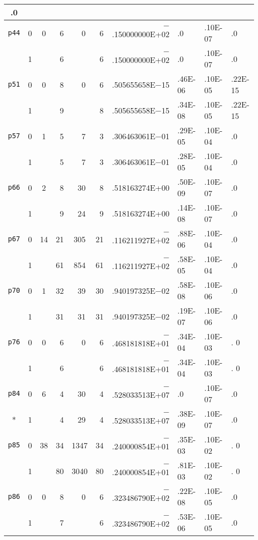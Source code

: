 {\begin{tabular}{ccccccrlll}
.0\\\hline
 {\tt p44} & 0 & 0  &  ~6  &  ~~0  & ~6 &$-$.150000000E+02 &.0      & .10E-07 &
.0\\
           & 1 &    &  ~6  &       &~6  &$-$.150000000E+02 &.0      & .10E-07 &
.0\\\hline
 {\tt p51} & 0 & 0  &  ~8  & ~~0   &~6  &   .505655658E$-$15 &.46E-06 &.10E-05 
&.22E-15\\
           & 1 &    &  ~9  &       &~8  &   .505655658E$-$15 &.34E-08 &.10E-05 
&.22E-15\\\hline
 {\tt p57} & 0 & 1  &  ~5  &  ~~7  &~3  &   .306463061E$-$01 &.29E-05 &.10E-04 
&.0\\
           & 1 &    &  ~5  &  ~~7  &~3  &   .306463061E$-$01 &.28E-05 &.10E-04 
&.0\\\hline
 {\tt p66} & 0 & 2  & ~8   &  ~30  &~8  &   .518163274E+00   &.50E-09 &.10E-07 
&.0\\
           & 1 &    & ~9   &  ~24  &~9  &   .518163274E+00   &.14E-08 &.10E-07 
&.0\\\hline
 {\tt p67} & 0 & 14 & 21   &  305  &21  &$-$.116211927E+02   &.88E-06 &.10E-04 
&.0\\
           & 1 &    & 61   &  854  &61  &$-$.116211927E+02   &.58E-05 &.10E-04 
&.0\\\hline
 {\tt p70} & 0 & 1  & 32   &  ~39  &30  &   .940197325E$-$02 &.58E-08 &.10E-06 
&.0\\
           & 1 &    & 31   &  ~31  &31  &   .940197325E$-$02 &.19E-07 &.10E-06 
&.0\\\hline
 {\tt p76} & 0 & 0  & ~6   & ~~0   &~6  &$-$.468181818E+01 &.34E-04 &.10E-03 &.
0\\
           & 1 &    & ~6   &       &~6  &$-$.468181818E+01 &.34E-04 &.10E-03 &.
0\\\hline
 {\tt p84} & 0 & 6  & ~4   &  ~30  &~4  &$-$.528033513E+07 &.0      & .10E-07 &
.0\\
*          & 1 &    & ~4   &  ~29  &~4  &$-$.528033513E+07 &.38E-09 & .10E-07 &
.0\\\hline
 {\tt p85} & 0 &38  & 34   & 1347  &34  &$-$.240000854E+01 &.35E-03 &.10E-02 &.
0\\
           & 1 &    & 80   & 3040  &80  &$-$.240000854E+01 &.81E-03 &.10E-02 &.
0\\\hline
 {\tt p86} & 0 & 0  & ~8   & ~~0   &~6  &$-$.323486790E+02 &.22E-08 & .10E-05 &
.0\\
           & 1 &    & ~7   &       &~6  &$-$.323486790E+02 &.53E-06 & .10E-05 &
.0\\\hline

\end{tabular}}

